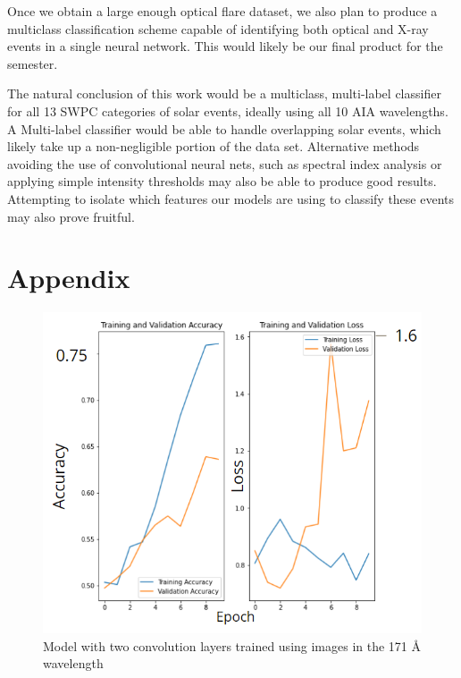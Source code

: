 \documentclass[12pt, letterpaper]{article}
\begin{document}
Once we obtain a large enough optical flare dataset, we also plan to produce a multiclass classification scheme capable of identifying both optical and X-ray events in a single neural network. This would likely be our final product for the semester.

The natural conclusion of this work would be a multiclass, multi-label classifier for all 13 SWPC categories of solar events, ideally using all 10 AIA wavelengths. A Multi-label classifier would be able to handle overlapping solar events, which likely take up a non-negligible portion of the data set. Alternative methods avoiding the use of convolutional neural nets, such as spectral index analysis or applying simple intensity thresholds may also be able to produce good results. Attempting to isolate which features our models are using to classify these events may also prove fruitful. 



\pagebreak
\section*{Appendix}

\begin{figure}[h]
	\includegraphics[width=\textwidth]{figures/171_twolayer.png}
	\centering
	\caption{Model with two convolution layers trained using images in the 171 Å wavelength}
	\label{CNN_171_2}
\end{figure}
\end{document}
